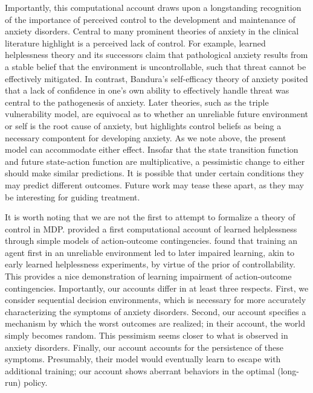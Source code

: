 \documentclass[11pt]{article} %
\begin{document}
Importantly, this computational account draws upon a longstanding recognition of the importance of perceived control to the development and maintenance of anxiety disorders. Central to many prominent theories of anxiety in the clinical literature highlight is a perceived lack of control. For example, learned helplessness theory and its successors claim that pathological anxiety results from a stable belief that the environment is uncontrollable, such that threat cannot be effectively mitigated. In contrast, Bandura's self-efficacy theory of anxiety posited that a lack of confidence in one's own ability to effectively handle threat was central to the pathogenesis of anxiety. Later theories, such as the triple vulnerability model, are equivocal as to whether an unreliable future environment or self is the root cause of anxiety, but highlights control beliefs as being a necessary compontent for developing anxiety. As we note above, the present model can accommodate either effect. Insofar that the state transition function and future state-action function are multiplicative, a pessimistic change to either should make similar predictions. It is possible that under certain conditions they may predict different outcomes. Future work may tease these apart, as they may be interesting for guiding treatment.

It is worth noting that we are not the first to attempt to formalize a theory of control in MDP. \cite{HuysDayan2009} provided a first computational account of learned helplessness through simple models of action-outcome contingencies. \cite{HuysDayan2009} found that training an agent first in an unreliable environment led to later impaired learning, akin to early learned helplessness experiments, by virtue of the prior of controllability. This provides a nice demonstration of learning impairment of action-outcome contingencies. Importantly, our accounts differ in at least three respects. First, we consider sequential decision environments, which is necessary for more accurately characterizing the symptoms of anxiety disorders. Second, our account specifies a mechanism by which the worst outcomes are realized; in their account, the world simply becomes random. This pessimism seems closer to what is observed in anxiety disorders. Finally, our account accounts for the persistence of these symptoms. Presumably, their model would eventually learn to escape with additional training; our account shows aberrant behaviors in the optimal (long-run) policy.
\end{document}
